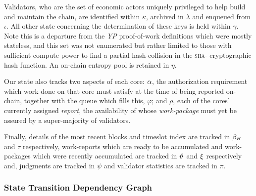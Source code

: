 Validators, who are the set of economic actors uniquely privileged to help build and maintain the \Jam chain, are identified within $\kappa$, archived in $\lambda$ and enqueued from $\iota$. All other state concerning the determination of these keys is held within $\gamma$. Note this is a departure from the \emph{YP} proof-of-work definitions which were mostly stateless, and this set was not enumerated but rather limited to those with sufficient compute power to find a partial hash-collision in the \textsc{sha}- cryptographic hash function. An on-chain entropy pool is retained in $\eta$.

Our state also tracks two aspects of each core: $\alpha$, the authorization requirement which work done on that core must satisfy at the time of being reported on-chain, together with the queue which fills this, $\varphi$; and $\rho$, each of the cores' currently assigned \emph{report}, the availability of whose \emph{work-package} must yet be assured by a super-majority of validators.

Finally, details of the most recent blocks and timeslot index are tracked in $\beta_H$ and $\tau$ respectively, work-reports which are ready to be accumulated and work-packages which were recently accumulated are tracked in $\vartheta$ and $\xi$ respectively and, judgments are tracked in $\psi$ and validator statistics are tracked in $\pi$.

\subsubsection{State Transition Dependency Graph}


